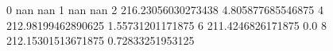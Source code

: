 0 nan nan
1 nan nan
2 216.23056030273438 4.805877685546875
4 212.98199462890625 1.55731201171875
6 211.4246826171875 0.0
8 212.15301513671875 0.72833251953125
